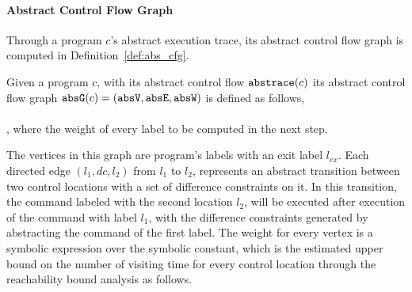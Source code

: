 \paragraph{Abstract Control Flow Graph} 
Through a program $c$'s abstract execution trace, its abstract control flow graph is computed in 
Definition~\ref{def:abs_cfg}.
\begin{defn}
\label{def:abs_cfg}
Given a program $c$, 
with its abstract control flow $\mathtt{abs}{\mathtt{trace}}(c)$
its abstract control flow graph $\mathtt{abs}{\mathtt{G}}(c) =(\mathtt{abs}{\mathtt{V}}, \mathtt{abs}{\mathtt{E}}, \mathtt{abs}{\mathtt{W}})$ is defined as follows,
\\
\\
, where the weight of every label to be computed in the next step.
\end{defn}
% 
The vertices in this graph are program's labels with an exit label $l_{ex}$.
Each directed 
 edge $(l_1, dc, l_2)$ from $l_1$ to $l_2$,
 represents an abstract transition 
 between two control locations with a set of difference constraints on it.
In this transition, the  command labeled with the second location $l_2$, 
 will be executed after execution of the command with label $l_1$,
with the difference constraints generated by abstracting the command of the first label.
The weight for every vertex is a symbolic expression over the symbolic constant, 
which is the estimated upper bound on the number of visiting time for every control location
through the reachability bound analysis as follows.
%
%
